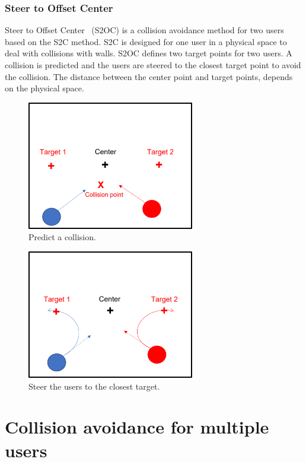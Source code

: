 \subsubsection{Steer to Offset Center}
Steer to Offset Center~\cite{6549377} (S2OC) is a collision avoidance method for two users based on the S2C method. S2C is designed for one user in a physical space to deal with collisions with walls. S2OC defines two target points for two users. A collision is predicted and the users are steered to the closest target point to avoid the collision. The distance between the center point and target points, depends on the physical space.
\begin{figure}[H]\centering
	\includegraphics[width=0.65\textwidth]{Pictures/OffsetCenter_1.png}%
	\caption{Predict a collision.}\label{fig:S2OC_detect_1}%
\end{figure}
\begin{figure}[H]\centering
	\includegraphics[width=0.65\textwidth]{Pictures/OffsetCenter_2.png}%
	\caption{Steer the users to the closest target.}\label{fig:S2OC_steer_2}%
\end{figure}
\newpage

\section{Collision avoidance for multiple users}

